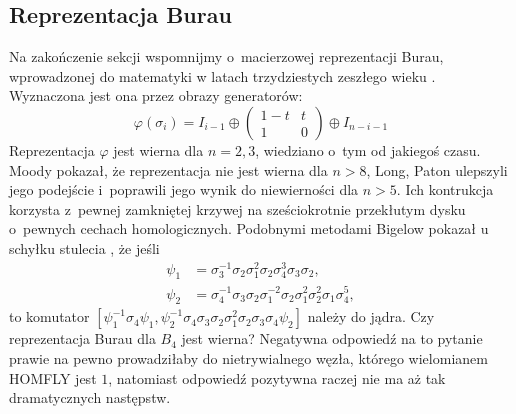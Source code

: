 
\subsection{Reprezentacja Burau}
Na zakończenie sekcji wspomnijmy o~macierzowej reprezentacji Burau, wprowadzonej do matematyki w latach trzydziestych zeszłego wieku \cite{burau33}.
%
%
Wyznaczona jest ona przez obrazy generatorów:
\begin{equation}
    \varphi(\sigma_i) = I_{i-1} \oplus \begin{pmatrix}
        1-t & t \\
        1   & 0
    \end{pmatrix} \oplus I_{n-i-1}
\end{equation}
Reprezentacja $\varphi$ jest wierna dla $n = 2, 3$, wiedziano o~tym od jakiegoś czasu. %
Moody \cite{moody91} pokazał, że reprezentacja nie jest wierna dla $n > 8$, Long, Paton \cite{paton93} ulepszyli jego podejście i~poprawili jego wynik do niewierności dla $n > 5$.
%
%
%
Ich kontrukcja korzysta z~pewnej zamkniętej krzywej na sześciokrotnie przekłutym dysku o~pewnych cechach homologicznych.
Podobnymi metodami Bigelow pokazał u schyłku stulecia \cite{bigelow99}, że jeśli
%
\begin{align}
    \psi_1 & = \sigma_3^{{-1}}\sigma_2\sigma_1^2\sigma_2\sigma_4^3\sigma_3\sigma_2, \\
\psi_2 & = \sigma_4^{{-1}}\sigma_3\sigma_2\sigma_1^{{-2}}\sigma_2\sigma_1^2\sigma_2^2\sigma_1\sigma_4^5,
\end{align}
to komutator $[\psi_1^{{-1}}\sigma_4\psi_1,\psi_2^{{-1}}\sigma_4\sigma_3\sigma_2\sigma_1^2\sigma_2\sigma_3\sigma_4\psi_2]$ należy do jądra.
Czy reprezentacja Burau dla $B_4$ jest wierna?
Negatywna odpowiedź na to pytanie prawie na pewno prowadziłaby do
nietrywialnego węzła, którego wielomianem HOMFLY jest $1$,
natomiast odpowiedź pozytywna raczej nie ma aż tak dramatycznych następstw.
